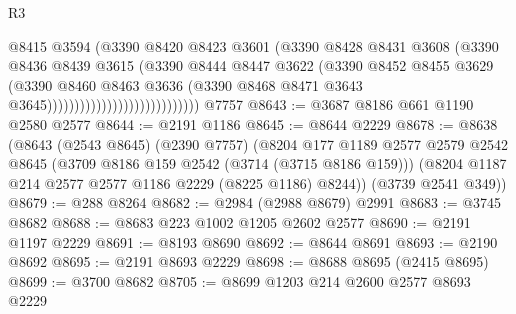 \begin{lexlean}{R3}
\begin{coremodule}
                                              @8415
                                              @3594
                                              (@3390
                                                @8420
                                                @8423
                                                @3601
                                                (@3390
                                                  @8428
                                                  @8431
                                                  @3608
                                                  (@3390
                                                    @8436
                                                    @8439
                                                    @3615
                                                    (@3390
                                                      @8444
                                                      @8447
                                                      @3622
                                                      (@3390
                                                        @8452
                                                        @8455
                                                        @3629
                                                        (@3390
                                                          @8460
                                                          @8463
                                                          @3636
                                                          (@3390
                                                            @8468
                                                            @8471
                                                            @3643
                                                            @3645))))))))))))))))))))))))))))
    @7757
@8643 := @3687 @8186 @661 @1190 @2580 @2577
@8644 := @2191 @1186
@8645 := @8644 @2229
@8678 := @8638
    (@8643
      (@2543 @8645)
      (@2390 @7757)
      (@8204
        @177
        @1189
        @2577
        @2579
        @2542
        @8645
        (@3709 @8186 @159 @2542 (@3714 (@3715 @8186 @159)))
        (@8204 @1187 @214 @2577 @2577 @1186 @2229 (@8225 @1186) @8244))
      (@3739 @2541 @349))
@8679 := @288 @8264
@8682 := @2984 (@2988 @8679) @2991
@8683 := @3745 @8682
@8688 := @8683 @223 @1002 @1205 @2602 @2577
@8690 := @2191 @1197 @2229
@8691 := @8193 @8690
@8692 := @8644 @8691
@8693 := @2190 @8692
@8695 := @2191 @8693 @2229
@8698 := @8688 @8695 (@2415 @8695)
@8699 := @3700 @8682
@8705 := @8699 @1203 @214 @2600 @2577 @8693 @2229

\end{coremodule}
\end{lexlean}
